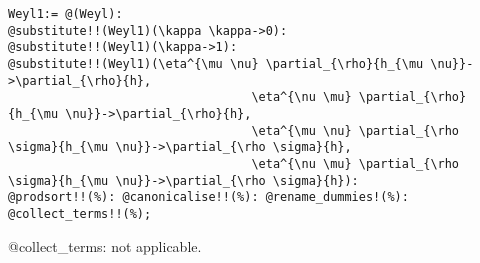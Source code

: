 \documentclass[11pt]{article}
\begin{document}
{\color[named]{Blue}\begin{verbatim}
Weyl1:= @(Weyl):
@substitute!!(Weyl1)(\kappa \kappa->0):
@substitute!!(Weyl1)(\kappa->1):
@substitute!!(Weyl1)(\eta^{\mu \nu} \partial_{\rho}{h_{\mu \nu}}->\partial_{\rho}{h},
                                  \eta^{\nu \mu} \partial_{\rho}{h_{\mu \nu}}->\partial_{\rho}{h},
                                  \eta^{\mu \nu} \partial_{\rho \sigma}{h_{\mu \nu}}->\partial_{\rho \sigma}{h},
                                  \eta^{\nu \mu} \partial_{\rho \sigma}{h_{\mu \nu}}->\partial_{\rho \sigma}{h}):
@prodsort!!(%): @canonicalise!!(%): @rename_dummies!(%): @collect_terms!!(%);
\end{verbatim}}
@collect\_terms: not applicable.
\end{document}
